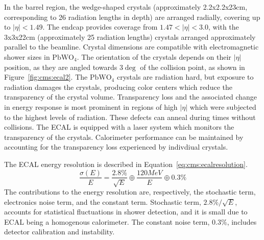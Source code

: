 In the barrel region, the wedge-shaped crystals (approximately 2.2x2.2x23cm, corresponding to 26 radiation lengths in depth) are arranged radially, covering up to $|\eta|<1.49$. The endcap provides coverage from $1.47<|\eta|<3.0$, with the 3x3x22cm (approximately 25 radiation lengths)  crystals arranged approximately parallel to the beamline. Crystal dimensions are compatible with electromagnetic shower sizes in $\mathrm{PbWO_4}$. The orientation of the crystals depends on their $|\eta|$ position, as they are angled towards $3\deg$ of the collision point, as shown in Figure~\ref{fig:cms:ecal2}.
 The $\mathrm{PbWO_4}$ crystals are radiation hard, but exposure to radiation damages the crystals, producing color centers which reduce the transparency of the crystal volume. Transparency loss and the associated change in energy response is most prominent in regions of high $|\eta|$ which were subjected to the highest levels of radiation\cite{Cipriani:2018ule}. These defects can anneal during times without collisions. The ECAL is equipped with a laser system which monitors the transparency of the crystals. Calorimeter performance can be maintained by accounting for the transparency loss experienced by indivdiual crystals\cite{CERN-LHCC-97-033}.   

The ECAL energy resolution is described in Equation~\ref{eq:cms:ecalresolution}. 
\begin{equation}
\frac{\sigma(E)}{E}=\frac{2.8\%}{\sqrt{E}} \oplus \frac{120 MeV}{E} \oplus 0.3\%
\label{eq:cms:ecalresolution}
\end{equation}
The contributions to the energy resolution are, respectively, the stochastic term, electronics noise term, and the constant term. Stochastic term, $2.8\%/\sqrt{E}$, accounts for statistical fluctuations in shower detection, and it is small due to ECAL being a homogenous calorimeter. The constant noise term, $0.3\%$, includes detector calibration and instability\cite{Adzic:2007mi}.
